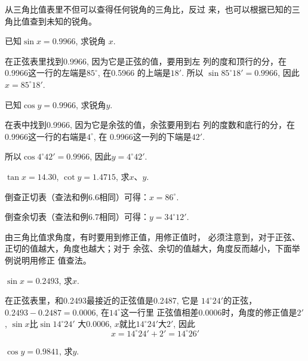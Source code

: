 从三角比值表里不但可以查得任何锐角的三角比，反过
来，也可以根据已知的三角比值查到未知的锐角。

\begin{example}
    已知$\sin x=0.9966$, 求锐角
    $x$.
\end{example}

\begin{solution}
    在正弦表里找到0.9966, 因为它是正弦的值，要用到左
    列的度和顶行的分，在0.9966这一行的左端是$85^{\circ}$, 在0.5966
    的上端是$18'$. 所以
   $ \sin85^{\circ}18'=0.9966$, 因此$x=85^{\circ}18'$.
\end{solution}

\begin{example}
已知$\cos y=0.9966$, 求锐角$y$.
\end{example}

\begin{solution}   
    在表中找到0.9966, 因为它是余弦的值，余弦要用到右
    列的度数和底行的分，在0.9966这一行的右端是$4^{\circ}$, 在
    0.9966这一列的下端是$42'$.

    所以$\cos4^{\circ}42'=0.9966$, 因此$y=4^{\circ}42'$.
\end{solution}

\begin{example}
   $\tan x=14.30$, $\cot y=1.4715$, 求$x$、$y$. 
\end{example}

\begin{solution}
    倒查正切表（查法和例6.6相同）可得：$x=86^{\circ}$.

倒查余切表（查法和例6.7相同）可得：$y=34^{\circ}12'$.
\end{solution}

由三角比值求角度，有时要用到修正值，用修正值时，
必须注意到，对于正弦、正切的值越大，角度也越大；对于
余弦、余切的值越大，角度反而越小，下面举例说明用修正
值查法。

\begin{example}
      $\sin x=0.2493$, 求$x$.
\end{example}

\begin{solution}
在正弦表里，和0.2493最接近的正弦值是0.2487, 它是
$14^{\circ}24'$的正弦，$0.2493-0.2487=0.0006$, 在$14^{\circ}$这一行里
正弦值相差0.0006时，角度的修正值是$2'$, $\sin x$比$\sin14^{\circ}24'$
大0.0006, $x$就比$14^{\circ}24'$大$2'$, 因此
\[x=14^{\circ}24'+2'=14^{\circ}26'\]
\end{solution}

\begin{example}
    $\cos y=0.9841$, 求$y$.
\end{example}

